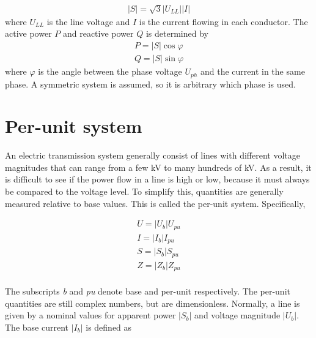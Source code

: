 \documentclass[class=book, crop=false]{standalone}
\begin{document}
\begin{equation}
   \begin{aligned}\label{eq:theory:three_phase_power}
|S| = \sqrt{3}|U_{LL}||I| 
\end{aligned} 
\end{equation}
where $U_{LL}$ is the line voltage and $I$ is the current flowing in each conductor. The active power $P$ and reactive power $Q$ is determined by 
\begin{equation}
   \begin{aligned}\label{eq:theory:three_phase_reactive}
P = |S|\cos{\varphi} \\
Q = |S|\sin{\varphi} 
\end{aligned} 
\end{equation}
where $\varphi$ is the angle between the phase voltage $U_{ph}$ and the current in the same phase. A symmetric system is assumed, so it is arbitrary which phase is used. 




\section{Per-unit system}
An electric transmission system generally consist of lines with different voltage magnitudes that can range from a few kV to many hundreds of kV. As a result, it is difficult to see if the power flow in a line is high or low, because it must always be compared to the voltage level. To simplify this, quantities are generally measured relative to base values. This is called the per-unit system. Specifically,


\begin{equation}
   \begin{aligned}\label{eq:theory:per_unit_all}
U = |U_{b}|U_{pu} \\
I = |I_{b}|I_{pu} \\
S = |S_{b}|S_{pu} \\
Z = |Z_{b}|Z_{pu} \\
\end{aligned} 
\end{equation}

The subscripts \textit{b} and \textit{pu} denote base and per-unit respectively. The per-unit quantities are still complex numbers, but are dimensionless. Normally, a line is given by a nominal values for apparent power $|S_{b}|$ and voltage magnitude $|U_{b}|$. The base current $|I_{b}|$ is defined as 
\end{document}

